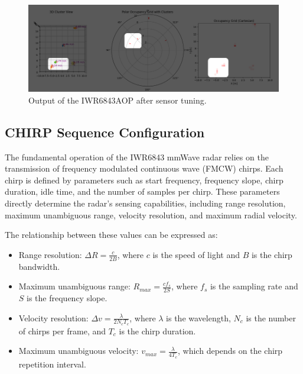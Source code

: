 \begin{figure}[!htbp]
    \centering
    \includegraphics[width=1.0\linewidth]{images/calib_ex2.png}
    \caption{Output of the IWR6843AOP after sensor tuning.}
    \label{fig:IWR6843AOP Calibration example2 for the sensor}
\end{figure}


\subsection{CHIRP Sequence Configuration}
\label{sec:chirp}

The fundamental operation of the IWR6843 mmWave radar relies on the transmission of frequency modulated continuous wave (FMCW) chirps.  
Each chirp is defined by parameters such as start frequency, frequency slope, chirp duration, idle time, and the number of samples per chirp.  
These parameters directly determine the radar’s sensing capabilities, including range resolution, maximum unambiguous range, velocity resolution, and maximum radial velocity.  

The relationship between these values can be expressed as:  
\begin{itemize}
    \item Range resolution: $\Delta R = \frac{c}{2B}$, where $c$ is the speed of light and $B$ is the chirp bandwidth.  
    \item Maximum unambiguous range: $R_{max} = \frac{c f_s}{2 S}$, where $f_s$ is the sampling rate and $S$ is the frequency slope.  
    \item Velocity resolution: $\Delta v = \frac{\lambda}{2 N_c T_c}$, where $\lambda$ is the wavelength, $N_c$ is the number of chirps per frame, and $T_c$ is the chirp duration.  
    \item Maximum unambiguous velocity: $v_{max} = \frac{\lambda}{4 T_c}$, which depends on the chirp repetition interval.  
\end{itemize}

